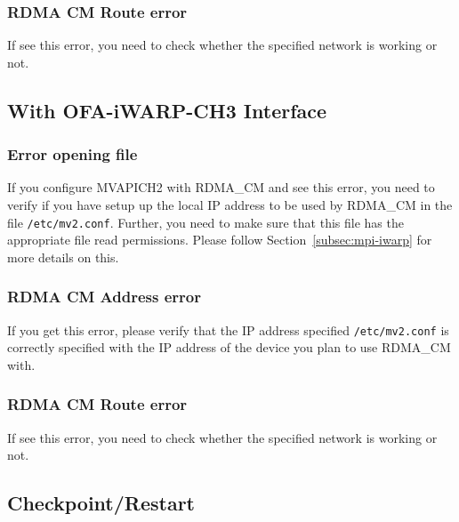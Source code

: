\subsubsection{RDMA CM Route error}
If see this error, you need to check whether the specified network is
working or not.

%

\subsection{With OFA-iWARP-CH3 Interface}
\subsubsection{Error opening file}
If you configure MVAPICH2 with RDMA\_CM and see this error, you need to
verify if you have setup up the local IP address to be used by
RDMA\_CM in the file \texttt{/etc/mv2.conf}. Further, you need to make sure
that this file has the appropriate file read permissions.
Please follow Section~\ref{subsec:mpi-iwarp} for more details on this.

\subsubsection{RDMA CM Address error}
If you get this error, please verify that the IP address specified
\texttt{/etc/mv2.conf} is correctly specified with the IP address of
the device you plan to use RDMA\_CM with.

\subsubsection{RDMA CM Route error}
If see this error, you need to check whether the specified network is
working or not.

\subsection{Checkpoint/Restart}
\label{sec:troubleshooting-ckpt}

